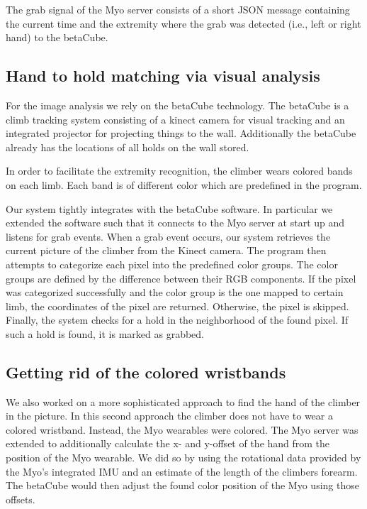 The grab signal of the Myo server consists of a short JSON message containing the current time and the extremity where the grab was detected (i.e., left or right hand) to the betaCube.

\subsection{Hand to hold matching via visual analysis}
For the image analysis we rely on the betaCube technology.
The betaCube is a climb tracking system consisting of a kinect camera for visual tracking and an integrated projector for projecting things to the wall.
Additionally the betaCube already has the locations of all holds on the wall stored.

In order to facilitate the extremity recognition, the climber wears colored bands on each limb.
Each band is of different color which are predefined in the program.

Our system tightly integrates with the betaCube software.
In particular we extended the software such that it connects to the Myo server at start up and listens for grab events.
When a grab event occurs, our system retrieves the current picture of the climber from the Kinect camera.
The program then attempts to categorize each pixel into the predefined color groups.
The color groups are defined by the difference between their RGB components.
If the pixel was categorized successfully and the color group is the one mapped to certain limb, the coordinates of the pixel are returned.
Otherwise, the pixel is skipped.
Finally, the system checks for a hold in the neighborhood of the found pixel.
If such a hold is found, it is marked as grabbed.

\subsection{Getting rid of the colored wristbands}
We also worked on a more sophisticated approach to find the hand of the climber in the picture.
In this second approach the climber does not have to wear a colored wristband.
Instead, the Myo wearables were colored.
The Myo server was extended to additionally calculate the x- and y-offset of the hand from the position of the Myo wearable.
We did so by using the rotational data provided by the Myo's integrated IMU and an estimate of the length of the climbers forearm.
The betaCube would then adjust the found color position of the Myo using those offsets.


